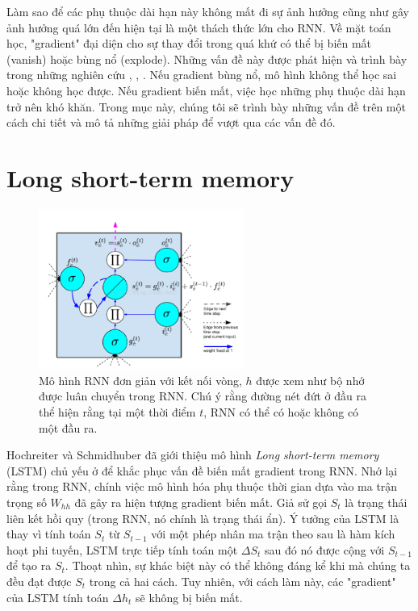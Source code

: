 Làm sao để các phụ thuộc dài hạn này không mất đi sự ảnh hưởng cũng như gây ảnh hưởng quá lớn đến hiện tại là một thách thức lớn cho RNN. Về mặt toán học, "gradient" đại diện cho sự thay đổi trong quá khứ có thể bị biến mất (vanish) hoặc bùng nổ (explode). Những vấn đề này được phát hiện và trình bày trong những nghiên cứu \cite{hochreiter1997}, \cite{bengio1994}, \cite{pascanu2011}. Nếu gradient bùng nổ, mô hình không thể học sai hoặc không học được. Nếu gradient biến mất, việc học những phụ thuộc dài hạn trở nên khó khăn. Trong mục này, chúng tôi sẽ trình bày những vấn đề trên một cách chi tiết và mô tả những giải pháp để vượt qua các vấn đề đó.


\section{Long short-term memory}

\begin{figure}
	\centering
	\includegraphics[width=0.6\textwidth]{lstmCell}
	\caption[Một "LSTM cell"]{Mô hình RNN đơn giản với kết nối vòng, \textbf{$h$} được xem như bộ nhớ được luân chuyển trong RNN. Chú ý rằng đường nét đứt ở đầu ra thể hiện rằng tại một thời điểm $t$, RNN có thể có hoặc không có một đầu ra.}
	\label{fig_lstmCell}
\end{figure}

Hochreiter và Schmidhuber \cite{hochreiter1997} đã giới thiệu mô hình \textit{Long short-term memory} (LSTM) chủ yếu ở để khắc phục vấn đề biến mất gradient trong RNN. Nhớ lại rằng trong RNN, chính việc mô hình hóa phụ thuộc thời gian dựa vào ma trận trọng số $W_{hh}$ đã gây ra hiện tượng gradient biến mất. Giả sử gọi $S_t$ là trạng thái liên kết hồi quy (trong RNN, nó chính là trạng thái ẩn). Ý tưởng của LSTM là thay vì tính toán $S_t$ từ $S_{t-1}$ với một phép nhân ma trận theo sau là hàm kích hoạt phi tuyến, LSTM trực tiếp tính toán một $\Delta S_t$ sau đó nó được cộng với $S_{t-1}$ để tạo ra $S_t$. Thoạt nhìn, sự khác biệt này có thể không đáng kể khi mà chúng ta đều đạt được $S_t$ trong cả hai cách. Tuy nhiên, với cách làm này, các "gradient" của LSTM tính toán $\Delta h_t$ sẽ không bị biến mất.

